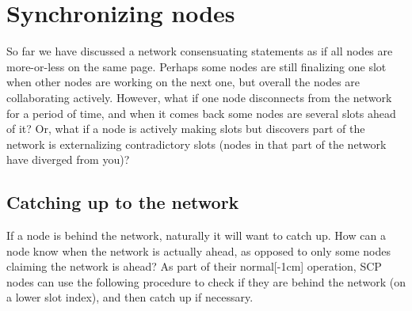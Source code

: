 \section{Synchronizing nodes}
\label{sec:consensus-synchronizing-nodes}

So far we have discussed a network consensuating statements as if all nodes are more-or-less on the same page. Perhaps some nodes are still finalizing one slot when other nodes are working on the next one, but overall the nodes are collaborating actively. However, what if one node disconnects from the network for a period of time, and when it comes back some nodes are several slots ahead of it? Or, what if a node is actively making slots but discovers part of the network is externalizing contradictory slots (nodes in that part of the network have diverged from you)?


\subsection{Catching up to the network}
\label{subsec:consensus-catching-up}

If a node is behind the network, naturally it will want to catch up. How can a node know when the network is actually ahead, as opposed to only some nodes claiming the network is ahead? As part of their normal[-1cm] operation, SCP nodes can use the following procedure to check if they are behind the network (on a lower slot index), and then catch up if necessary.

